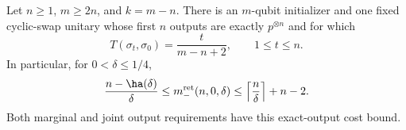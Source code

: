 \begin{theorem}\label{thm:dyadic}
Let $n\ge1$, $m\ge2n$, and $k=m-n$. There is an $m$-qubit initializer and one fixed cyclic-swap unitary whose first $n$ outputs are exactly $p^{\otimes n}$ and for which
\begin{equation}
 T(\sigma_t,\sigma_0)=\frac{t}{m-n+2},\qquad 1\le t\le n.
 \label{eq:dyadicreturn}
\end{equation}
In particular, for $0<\delta\le1/4$,
\begin{equation}
 \frac{n-\ha(\delta)}{\delta}
 \le m_-^{\rm ret}(n,0,\delta)
 \le \left\lceil\frac n\delta\right\rceil+n-2.
 \label{eq:erasurecost}
\end{equation}
Both marginal and joint output requirements have this exact-output cost bound.
\end{theorem}
